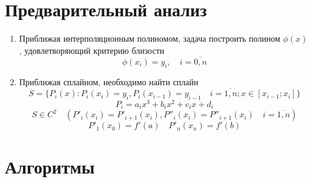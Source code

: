 \documentclass[a4paper]{article}
\begin{document}
\section{Предварительный анализ}\label{sec:analysys}
\begin{enumerate}
        \item Приближая интерполяционным полиномом, задача построить полином \(\phi(x)\), удовлетворяющий критерию близости \[
        \phi(x_{i}) = y_{i}, \quad i = \overline{0,n}
        \]
  \item Приближая сплайном, необходимо найти сплайн \[
        S = \{ P_{i}(x) : P_{i}(x_{i}) = y_{i}, P_{i}(x_{i-1}) = y_{i-1} \quad i = \overline{1,n}; x \in [x_{i-1}; x_{i}]\}
        \]\[
        P_{i} = a_{i}x^{3}+b_{i}x^2+c_{i}x + d_{i}
        \]\[
        S \in C^{2} \quad (P'_{i}(x_{i}) = P'_{i+1}(x_{i}), P''_{i}(x_{i}) = P''_{i+1}(x_{i}) \quad i = \overline{1,n})
        \]\[
        P'_{1}(x_0) = f'(a) \quad P'_{n}(x_{n}) = f'(b)
        \]
\end{enumerate}
\section{Алгоритмы}\label{sec:algo}
\end{document}
